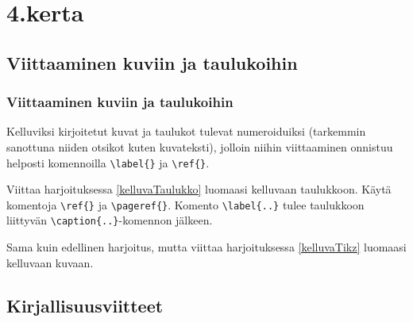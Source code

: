 \section{4.kerta}


\subsection{Viittaaminen kuviin ja taulukoihin}

\begin{fframe}
    \frametitle{Viittaaminen kuviin ja taulukoihin}
    Kelluviksi kirjoitetut kuvat ja taulukot tulevat numeroiduiksi (tarkemmin sanottuna niiden otsikot kuten kuvateksti), jolloin niihin viittaaminen onnistuu helposti komennoilla \lstinline-\label{}- ja \lstinline-\ref{}-. 
    \begin{harj}
        Viittaa harjoituksessa \ref{kelluvaTaulukko} luomaasi kelluvaan taulukkoon. Käytä komentoja \lstinline-\ref{}- ja \lstinline-\pageref{}-. Komento \lstinline-\label{..}- tulee taulukkoon liittyvän \lstinline-\caption{..}--komennon jälkeen.
    \end{harj}
    \begin{harj}
        Sama kuin edellinen harjoitus, mutta viittaa harjoituksessa \ref{kelluvaTikz} luomaasi kelluvaan kuvaan.
    \end{harj}
\end{fframe}


\subsection{Kirjallisuusviitteet}

